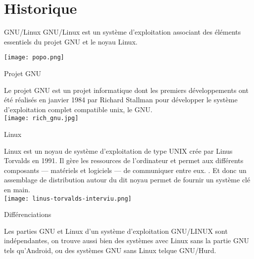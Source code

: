 \documentclass{beamer}
\begin{document}
\section{Historique}
\begin{frame}{}

 \begin{block}{GNU/Linux}
 GNU/Linux est un système d'exploitation associant des éléments essentiels du projet GNU et le noyau Linux. \\ 
 
\raggedright \centering\texttt{[image: popo.png]}
\end{block}
\end{frame}

\begin{frame}{}
\begin{block}{Projet GNU}
\raggedright Le projet GNU est un projet informatique dont les premiers développements ont été réalisés en janvier 1984 par Richard Stallman pour développer le système d'exploitation complet compatible unix, le GNU.\\ 
\centering\texttt{[image: rich\_gnu.jpg]}
\end{block}
\end{frame}

\begin{frame}{Linux}
\begin{block}{}
Linux est un noyau de système d'exploitation de type UNIX crée par Linus Torvalds en 1991. Il gère les ressources de l’ordinateur et permet aux différents composants — matériels et logiciels — de communiquer entre eux. . Et donc un assemblage de distribution autour du dit noyau permet de fournir un système clé en main.\\ 
\centering\texttt{[image: linus-torvalds-interviu.png]}
\end{block}
\end{frame}
\begin{frame}{Différenciations}
    \begin{block}
        \raggedright Les parties GNU et Linux d’un système d’exploitation GNU/LINUX sont indépendantes, on trouve aussi bien des systèmes avec Linux sans la partie GNU tels qu'Android, ou des systèmes GNU sans Linux telque GNU/Hurd.
    \end{block}
\end{frame}
\end{document}
